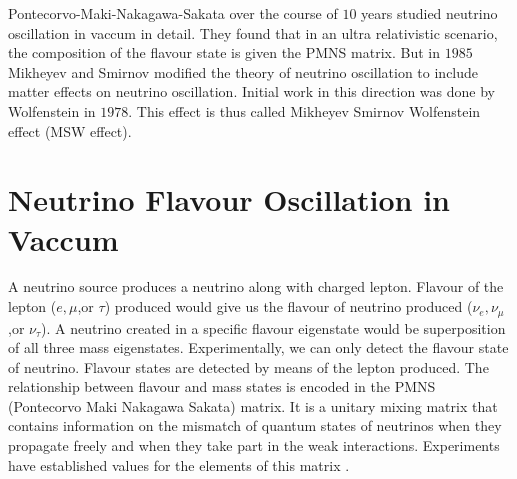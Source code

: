 \documentclass[12pt,a4paper]{report}
\begin{document}
Pontecorvo-Maki-Nakagawa-Sakata over the course of $10$ years studied neutrino oscillation in vaccum in detail. They found that in an ultra relativistic scenario, the composition of the flavour state is given the PMNS matrix. But in $1985$ Mikheyev and Smirnov modified the theory of neutrino oscillation to include matter effects on neutrino oscillation. Initial work in this direction was done by Wolfenstein in $1978$. This effect is thus called Mikheyev Smirnov Wolfenstein effect (MSW effect). 
\section{Neutrino Flavour Oscillation in Vaccum}\label{FO}
 A neutrino source produces a neutrino along with charged lepton. Flavour of the lepton ($e,\mu$,or $\tau$) produced would give us the flavour of neutrino produced ($\nu_{e},\nu_{\mu}$,or $\nu_{\tau}$). A neutrino created in a specific flavour eigenstate would be superposition of all three mass eigenstates. Experimentally, we can only detect the flavour state of neutrino. Flavour states are detected by means of the lepton produced. The relationship between flavour and mass states is encoded in the PMNS (Pontecorvo Maki Nakagawa Sakata) matrix. It is a unitary mixing matrix that contains information on the mismatch of quantum states of neutrinos when they propagate freely and when they take part in the weak interactions. Experiments have established values for the elements of this matrix \cite{zyla}.\par

\end{document}
